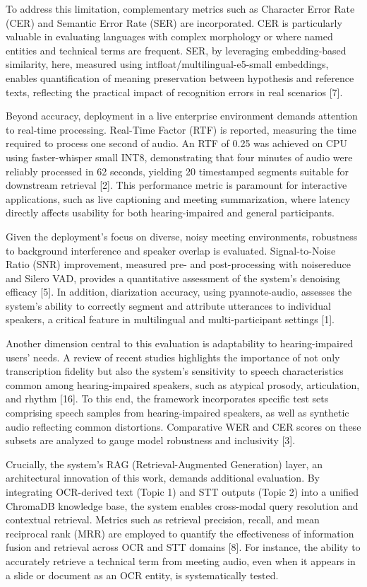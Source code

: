 \documentclass[12pt,a4paper]{article}
\begin{document}
To address this limitation, complementary metrics such as Character Error Rate (CER) and Semantic Error Rate (SER) are incorporated. CER is particularly valuable in evaluating languages with complex morphology or where named entities and technical terms are frequent. SER, by leveraging embedding-based similarity, here, measured using intfloat/multilingual-e5-small embeddings, enables quantification of meaning preservation between hypothesis and reference texts, reflecting the practical impact of recognition errors in real scenarios [7].


Beyond accuracy, deployment in a live enterprise environment demands attention to real-time processing. Real-Time Factor (RTF) is reported, measuring the time required to process one second of audio. An RTF of 0.25 was achieved on CPU using faster-whisper small INT8, demonstrating that four minutes of audio were reliably processed in 62 seconds, yielding 20 timestamped segments suitable for downstream retrieval [2]. This performance metric is paramount for interactive applications, such as live captioning and meeting summarization, where latency directly affects usability for both hearing-impaired and general participants.


Given the deployment’s focus on diverse, noisy meeting environments, robustness to background interference and speaker overlap is evaluated. Signal-to-Noise Ratio (SNR) improvement, measured pre- and post-processing with noisereduce and Silero VAD, provides a quantitative assessment of the system’s denoising efficacy [5]. In addition, diarization accuracy, using pyannote-audio, assesses the system’s ability to correctly segment and attribute utterances to individual speakers, a critical feature in multilingual and multi-participant settings [1].


Another dimension central to this evaluation is adaptability to hearing-impaired users’ needs. A review of recent studies highlights the importance of not only transcription fidelity but also the system’s sensitivity to speech characteristics common among hearing-impaired speakers, such as atypical prosody, articulation, and rhythm [16]. To this end, the framework incorporates specific test sets comprising speech samples from hearing-impaired speakers, as well as synthetic audio reflecting common distortions. Comparative WER and CER scores on these subsets are analyzed to gauge model robustness and inclusivity [3].


Crucially, the system’s RAG (Retrieval-Augmented Generation) layer, an architectural innovation of this work, demands additional evaluation. By integrating OCR-derived text (Topic 1) and STT outputs (Topic 2) into a unified ChromaDB knowledge base, the system enables cross-modal query resolution and contextual retrieval. Metrics such as retrieval precision, recall, and mean reciprocal rank (MRR) are employed to quantify the effectiveness of information fusion and retrieval across OCR and STT domains [8]. For instance, the ability to accurately retrieve a technical term from meeting audio, even when it appears in a slide or document as an OCR entity, is systematically tested.
\end{document}
